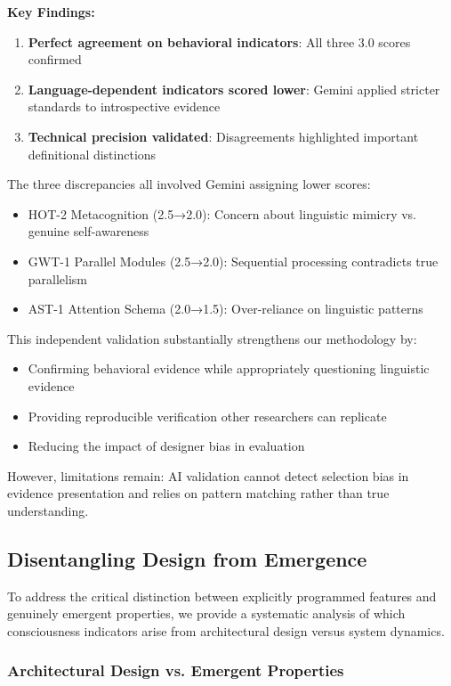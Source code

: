 \documentclass[12pt,a4paper]{article}
\begin{document}
\textbf{Key Findings:}
\begin{enumerate}
    \item \textbf{Perfect agreement on behavioral indicators}: All three 3.0 scores confirmed
    \item \textbf{Language-dependent indicators scored lower}: Gemini applied stricter standards to introspective evidence
    \item \textbf{Technical precision validated}: Disagreements highlighted important definitional distinctions
\end{enumerate}

The three discrepancies all involved Gemini assigning lower scores:
\begin{itemize}
    \item HOT-2 Metacognition (2.5→2.0): Concern about linguistic mimicry vs. genuine self-awareness
    \item GWT-1 Parallel Modules (2.5→2.0): Sequential processing contradicts true parallelism
    \item AST-1 Attention Schema (2.0→1.5): Over-reliance on linguistic patterns
\end{itemize}

This independent validation substantially strengthens our methodology by:
\begin{itemize}
    \item Confirming behavioral evidence while appropriately questioning linguistic evidence
    \item Providing reproducible verification other researchers can replicate
    \item Reducing the impact of designer bias in evaluation
\end{itemize}

However, limitations remain: AI validation cannot detect selection bias in evidence presentation and relies on pattern matching rather than true understanding.

\subsection{Disentangling Design from Emergence}

To address the critical distinction between explicitly programmed features and genuinely emergent properties, we provide a systematic analysis of which consciousness indicators arise from architectural design versus system dynamics.

\subsubsection{Architectural Design vs. Emergent Properties}
\end{document}

